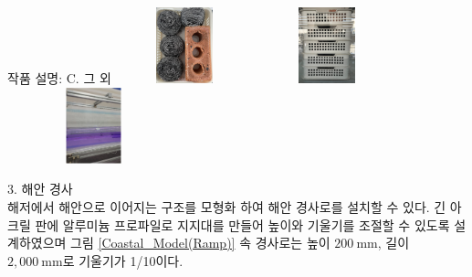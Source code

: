 \documentclass[a0paper,portrait]{Junlam_PosterP}
\begin{document}
\begin{poster}
\begin{posterbox}[name=wmaker,column=0,below=theo, above=bottom] {작품 설명: C. 그 외}
        \includegraphics[width=0.3\textwidth, height=2.2cm]{images/sopagi2.jpg}
        \includegraphics[width=0.3\textwidth, height=2.2cm]{images/sopagi1.jpg}
        \includegraphics[width=0.375\textwidth, height=2.2cm]{images/Wave_Gauge.jpg}
        \caption{(a) 플라스틱 바구니에 철수세미와 벽돌을 담은 모습, (b) 플라스틱 바구니를 수직으로 쌓아 올린 모습, (c) 파고를 측정하는 모습}
        \label{wave absorb} 
    
\small{3. 해안 경사\\}
    \scriptsize {해저에서 해안으로 이어지는 구조를 모형화 하여 해안 경사로를 설치할 수 있다. 긴 아크릴 판에 알루미늄 프로파일로 지지대를 만들어 높이와 기울기를 조절할 수 있도록 설계하였으며 그림 \ref{Coastal_Model(Ramp)} 속 경사로는 높이 $200\mathrm{~mm}$, 길이 $2,000\mathrm{~mm}$로 기울기가 1/10이다.}


\end{posterbox}
\end{poster}
\end{document}
